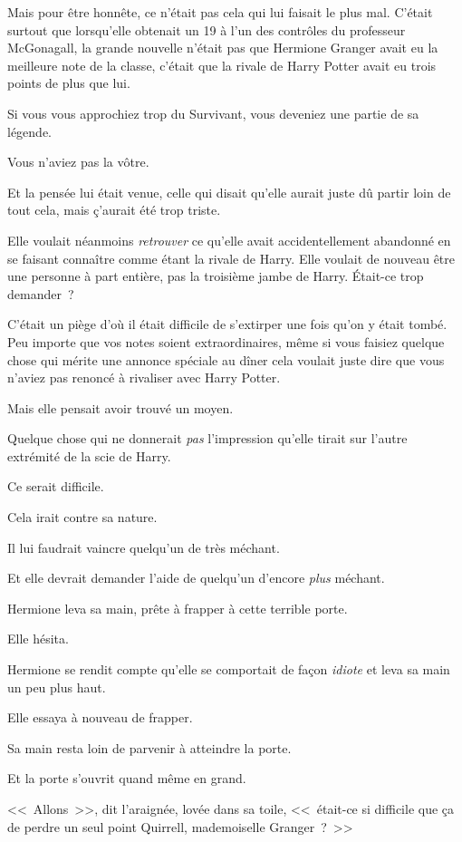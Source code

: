 Mais pour être honnête, ce n'était pas cela qui lui faisait le plus mal. C'était surtout que lorsqu'elle obtenait un 19 à l'un des contrôles du professeur McGonagall, la grande nouvelle n'était pas que Hermione Granger avait eu la meilleure note de la classe, c'était que la rivale de Harry Potter avait eu trois points de plus que lui.

Si vous vous approchiez trop du Survivant, vous deveniez une partie de sa légende.

Vous n'aviez pas la vôtre.

Et la pensée lui était venue, celle qui disait qu'elle aurait juste dû partir loin de tout cela, mais ç'aurait été trop triste.

Elle voulait néanmoins \emph{retrouver} ce qu'elle avait accidentellement abandonné en se faisant connaître comme étant la rivale de Harry. Elle voulait de nouveau être une personne à part entière, pas la troisième jambe de Harry. Était-ce trop demander~?

C'était un piège d'où il était difficile de s'extirper une fois qu'on y était tombé. Peu importe que vos notes soient extraordinaires, même si vous faisiez quelque chose qui mérite une annonce spéciale au dîner cela voulait juste dire que vous n'aviez pas renoncé à rivaliser avec Harry Potter.

Mais elle pensait avoir trouvé un moyen.

Quelque chose qui ne donnerait \emph{pas} l'impression qu'elle tirait sur l'autre extrémité de la scie de Harry.

Ce serait difficile.

Cela irait contre sa nature.

Il lui faudrait vaincre quelqu'un de très méchant.

Et elle devrait demander l'aide de quelqu'un d'encore \emph{plus} méchant.

Hermione leva sa main, prête à frapper à cette terrible porte.

Elle hésita.

Hermione se rendit compte qu'elle se comportait de façon \emph{idiote} et leva sa main un peu plus haut.

Elle essaya à nouveau de frapper.

Sa main resta loin de parvenir à atteindre la porte.

Et la porte s'ouvrit quand même en grand.

<<~Allons~>>, dit l'araignée, lovée dans sa toile, <<~était-ce si difficile que ça de perdre un seul point Quirrell, mademoiselle Granger~?~>>


